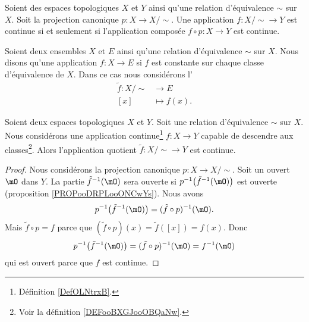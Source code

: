 \begin{proposition}       \label{PROPooYKLBooQuqnfA}
	Soient des espaces topologiques \( X\) et \( Y\) ainsi qu'une relation d'équivalence \( \sim\) sur \( X\). Soit la projection canonique \( p\colon X\to X/\sim\). Une application \( f\colon X/\sim\to Y\) est continue si et seulement si l'application composée \( f\circ p\colon X\to Y\) est continue.
\end{proposition}

\begin{definition}       \label{DEFooBXGJooOBQaNw}
	Soient deux ensembles \( X\) et \( E\) ainsi qu'une relation d'équivalence \( \sim\) sur \( X\). Nous disons qu'une application \( f\colon X\to E\)  si \( f\) est constante sur chaque classe d'équivalence de \( X\). Dans ce cas nous considérons l'
	\begin{equation}
		\begin{aligned}
			\tilde f\colon X/\sim & \to E         \\
			[x]                   & \mapsto f(x).
		\end{aligned}
	\end{equation}
\end{definition}

\begin{lemma}     \label{LEMooKTINooKDjNeX}
	Soient deux espaces topologiques \( X\) et \( Y\). Soit une relation d'équivalence \( \sim\) sur \( X\). Nous considérons une application continue\footnote{Définition \ref{DefOLNtrxB}.} \( f\colon X\to Y\) capable de descendre aux classes\footnote{Voir la définition \ref{DEFooBXGJooOBQaNw}.}. Alors l'application quotient \( \tilde f\colon X/\sim\to Y\) est continue.
\end{lemma}

\begin{proof}
	Nous considérons la projection canonique \( p\colon X\to X/\sim\). Soit un ouvert \( \mO\) dans \( Y\). La partie \( \tilde f^{-1}(\mO)\) sera ouverte si \( p^{-1}\big( \tilde f^{-1}(\mO) \big)\) est ouverte (proposition \ref{PROPooDRPLooONCwYs}). Nous avons
	\begin{equation}
		p^{-1}\big( \tilde f^{-1}(\mO) \big)=(\tilde f\circ p)^{-1}(\mO).
	\end{equation}
	Mais \( \tilde f\circ p=f\) parce que \( (\tilde f\circ p)(x)=\tilde f([x])=f(x)\). Donc
	\begin{equation}
		p^{-1}\big( \tilde f^{-1}(\mO) \big)=(\tilde f\circ p)^{-1}(\mO)=f^{-1}(\mO)
	\end{equation}
	qui est ouvert parce que \( f\) est continue.
\end{proof}

